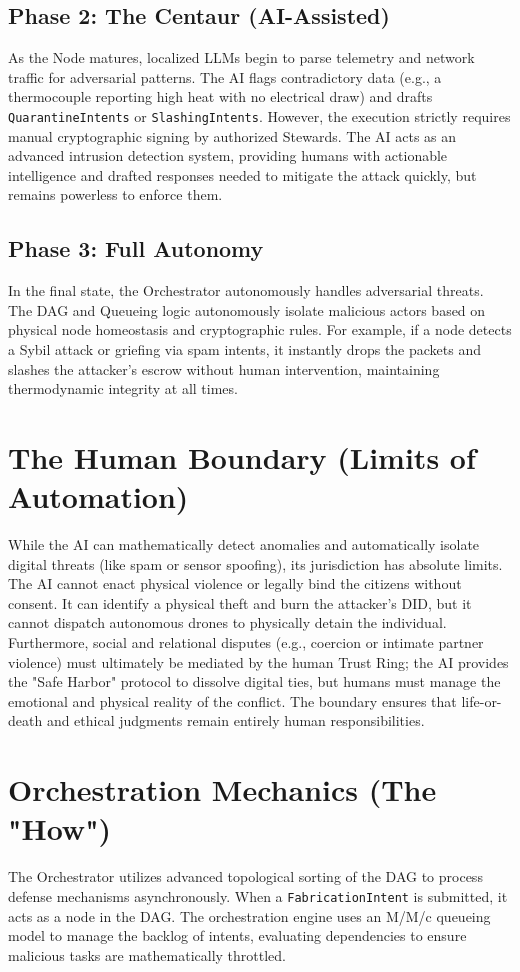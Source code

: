 \subsection{Phase 2: The Centaur (AI-Assisted)}
As the Node matures, localized LLMs begin to parse telemetry and network traffic for adversarial patterns. The AI flags contradictory data (e.g., a thermocouple reporting high heat with no electrical draw) and drafts \texttt{QuarantineIntents} or \texttt{SlashingIntents}. However, the execution strictly requires manual cryptographic signing by authorized Stewards. The AI acts as an advanced intrusion detection system, providing humans with actionable intelligence and drafted responses needed to mitigate the attack quickly, but remains powerless to enforce them.

\subsection{Phase 3: Full Autonomy}
In the final state, the Orchestrator autonomously handles adversarial threats. The DAG and Queueing logic autonomously isolate malicious actors based on physical node homeostasis and cryptographic rules. For example, if a node detects a Sybil attack or griefing via spam intents, it instantly drops the packets and slashes the attacker's escrow without human intervention, maintaining thermodynamic integrity at all times.

\section{The Human Boundary (Limits of Automation)}
While the AI can mathematically detect anomalies and automatically isolate digital threats (like spam or sensor spoofing), its jurisdiction has absolute limits. The AI cannot enact physical violence or legally bind the citizens without consent. It can identify a physical theft and burn the attacker's DID, but it cannot dispatch autonomous drones to physically detain the individual. Furthermore, social and relational disputes (e.g., coercion or intimate partner violence) must ultimately be mediated by the human Trust Ring; the AI provides the "Safe Harbor" protocol to dissolve digital ties, but humans must manage the emotional and physical reality of the conflict. The boundary ensures that life-or-death and ethical judgments remain entirely human responsibilities.

\section{Orchestration Mechanics (The "How")}
The Orchestrator utilizes advanced topological sorting of the DAG to process defense mechanisms asynchronously. When a \texttt{FabricationIntent} is submitted, it acts as a node in the DAG. The orchestration engine uses an M/M/c queueing model to manage the backlog of intents, evaluating dependencies to ensure malicious tasks are mathematically throttled. 

